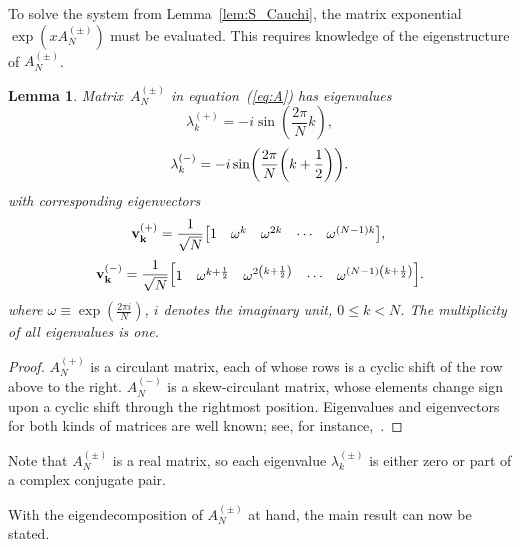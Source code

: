 \documentclass{article}
\newtheorem{lemma}[theorem]{Lemma}
\begin{document}
To solve the system from Lemma~\ref{lem:S_Cauchi}, the matrix exponential $\exp(x A^{(\pm)}_N)$ must be evaluated.
This requires knowledge of the eigenstructure of $A^{(\pm)}_N$.

\begin{lemma}
\label{lem:A_eigen}
Matrix~$A^{(\pm)}_N$ in equation~(\ref{eq:A}) has eigenvalues
\begin{equation}
\lambda^{(+)}_k = -i \sin(\frac{2\pi}{N}k),
\end{equation}
\begin{equation}
\lambda^{(-)}_k = -i \sin(\frac{2\pi}{N}\qty(k+\frac{1}{2})).
\end{equation}
with corresponding eigenvectors
\begin{equation}
\vb{v^{(+)}_k} = \frac{1}{\sqrt{N}} \mqty[1& \omega^k& \omega^{2k}& \cdots& \omega^{\qty(N-1)k}],\\
\end{equation}
\begin{equation}
\vb{v^{(-)}_k} = \frac{1}{\sqrt{N}} \mqty[1& \omega^{k+\frac{1}{2}}& \omega^{2\qty(k+\frac{1}{2})}& \cdots& \omega^{\qty(N-1)\qty(k+\frac{1}{2})}].
\end{equation}
where $\omega \equiv \exp(\frac{2\pi i}{N})$, $i$ denotes the imaginary unit, $0 \le k < N$.
The multiplicity of all eigenvalues is one.
\end{lemma}

\begin{proof}
$A^{(+)}_N$ is a circulant matrix, each of whose rows is a cyclic shift of the row above to the right.
$A^{(-)}_N$ is a skew-circulant matrix, whose elements change sign upon a cyclic shift through the rightmost position.
Eigenvalues and eigenvectors for both kinds of matrices are well known; see, for instance,~\cite{Karner2003}.
\end{proof}

Note that $A^{(\pm)}_N$ is a real matrix, so each eigenvalue $\lambda^{(\pm)}_k$ is either zero or part of a complex conjugate pair.

With the eigendecomposition of $A^{(\pm)}_N$ at hand, the main result can now be stated.
\end{document}

